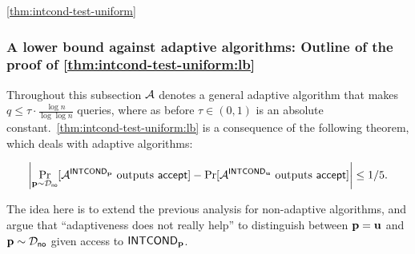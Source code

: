 \begin{proofof}{\cref{thm:intcond-test-uniform}}
\subsubsection{A lower bound against adaptive algorithms:  Outline of the proof of
\cref{thm:intcond-test-uniform:lb}}\label{sssec:unif-lb:intcond:adapt}
Throughout this subsection  $\mathcal{A}$ denotes a general
adaptive algorithm that makes $q \leq \tau \cdot {\frac {\log n}
{\log \log n}}$ queries, where as before $\tau\in (0,1)$ is an absolute constant.~\cref{thm:intcond-test-uniform:lb} is a
consequence of the following theorem, which deals with adaptive algorithms:
\begin{theorem} \label{theorem:adaptive:transcript:distribution:closeness}
\begin{equation} \label{eq:intcond:unif:adapt}
\left|
\Pr_{\mathbf{p} \sim \mathcal{D}_{\textsf{no}}}[\mathcal{A}^{{\sf INTCOND}_{\mathbf{p}}} \text{~outputs~} \textsf{accept}] - \Pr[\mathcal{A}^{{\sf INTCOND}_{\mathbf{u}}} \text{~outputs~} \textsf{accept}] \right| \leq 1/5.
\end{equation}
\end{theorem}

The idea here is to extend the previous analysis for non-adaptive algorithms,
and argue that ``{adaptiveness does not really help}'' to distinguish between $\mathbf{p} = \mathbf{u}$ and $\mathbf{p} \sim \mathcal{D}_{\textsf{no}}$
given access to ${\sf INTCOND}_{\mathbf{p}}$.



\end{proofof}
